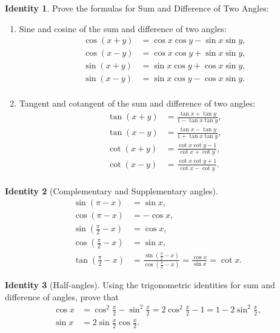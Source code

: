 \documentclass[12pt,a4paper]{memoir}
\theoremstyle{definition}
\newtheorem{identity}{Identity}
\begin{document}
\begin{identity}Prove the formulas for Sum and Difference of Two Angles:
	\begin{enumerate}
		\item Sine and cosine of the sum and difference of two angles:
		\begin{align}
			\cos(x+y) &= \cos x \cos y - \sin x \sin y,\label{id:1}\\
			\cos(x-y) &= \cos x \cos y + \sin x \sin y,\label{id:2}\\
			\sin(x+y) &= \sin x \cos y + \cos x \sin y,\label{id:3}\\
			\sin(x-y) &= \sin x \cos y - \cos x \sin y.\label{id:4}\\
		\end{align}
		\item Tangent and cotangent of the sum and difference of two angles:
		\begin{align}
			\tan(x+y) &= \frac{\tan x + \tan y}{1 - \tan x \tan y},\label{id:t1}\\
			\tan(x-y) &= \frac{\tan x - \tan y}{1 + \tan x \tan y},\label{id:t2}\\
			\cot(x+y) &= \frac{\cot x \cot y - 1}{\cot x + \cot y},\label{id:t3}\\
			\cot(x-y) &= \frac{\cot x \cot y + 1}{\cot x - \cot y}.\label{id:t4}\\
		\end{align}
	\end{enumerate}
\end{identity}



\begin{identity}[Complementary and Supplementary angles]
	\begin{align}
		\sin(\pi - x) &= \sin x, \label{id:sin(pi-x)}\\
		\cos (\pi -x) &= - \cos x, \label{id:cos(pi-x)}\\
		\sin\left(\frac{\pi}{2} - x\right) &= \cos x, \label{id:sin(pi/2-x)}\\
		\cos\left(\frac{\pi}{2} - x\right) &= \sin x, \label{id:cos(pi/2-x)}\\
		\tan \left(\frac{\pi}{2} - x \right) &= \frac{\sin\left(\frac{\pi}{2} - x\right)}{ \cos\left(\frac{\pi}{2} - x\right)} = \frac{\cos x}{\sin x} = \cot x. \label{id:tan(pi/2-x)}
	\end{align}
\end{identity}


\begin{identity}[Half-angles]
	Using the trigonometric identities for sum and difference of angles, prove that
	\begin{align}
		\cos x &= \cos^2\frac x2 - \sin^2 \frac x2 = 2 \cos^2 \frac x2 - 1 = 1 - 2 \sin^2 \frac x2, \label{cos-half-angle}\\
		\sin x &= 2 \sin \frac x2 \cos \frac x2. \label{sin-half-angle}
	\end{align}
\end{identity}
\end{document}
